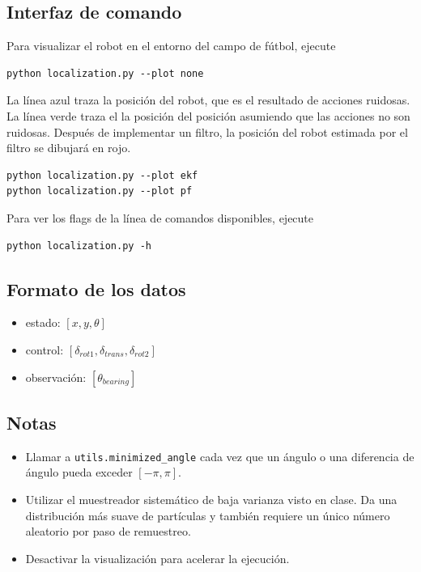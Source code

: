 \documentclass[tp]{lcc}
\begin{document}
	\subsection{Interfaz de comando}

	Para visualizar el robot en el entorno del campo de fútbol, ejecute

\begin{lstlisting}[style=bash] 
python localization.py --plot none
\end{lstlisting}


	La línea {\color{blue} azul} traza la posición del robot, que es el resultado de acciones ruidosas. La línea {\color{green} verde} traza el la posición del posición asumiendo que las acciones no son ruidosas. Después de implementar un filtro, la posición del robot estimada por el filtro se dibujará en {\color{red} rojo}.
	
	
\begin{lstlisting}[style=bash] 
python localization.py --plot ekf
python localization.py --plot pf
\end{lstlisting}

	Para ver los flags de la línea de comandos disponibles, ejecute

\begin{lstlisting}[style=bash] 
python localization.py -h
\end{lstlisting}

	\subsection{Formato de los datos}

	\begin{itemize}
		\item estado: $[x,y,\theta]$
		\item control: $[\delta_{rot1},\delta_{trans},\delta_{rot2}]$
		\item observación: $[\theta_{bearing}]$
	\end{itemize}
	
	\subsection{Notas}
	\begin{itemize}
		\item Llamar a \lstinline[style=bash]{utils.minimized_angle} cada vez que un ángulo o una diferencia de ángulo pueda exceder $[-\pi, \pi]$.
		\item Utilizar el muestreador sistemático de baja varianza visto en clase. Da una distribución más suave de partículas y también requiere un único número aleatorio por paso de remuestreo.
		\item Desactivar la visualización para acelerar la ejecución.
	\end{itemize}
\end{document}
